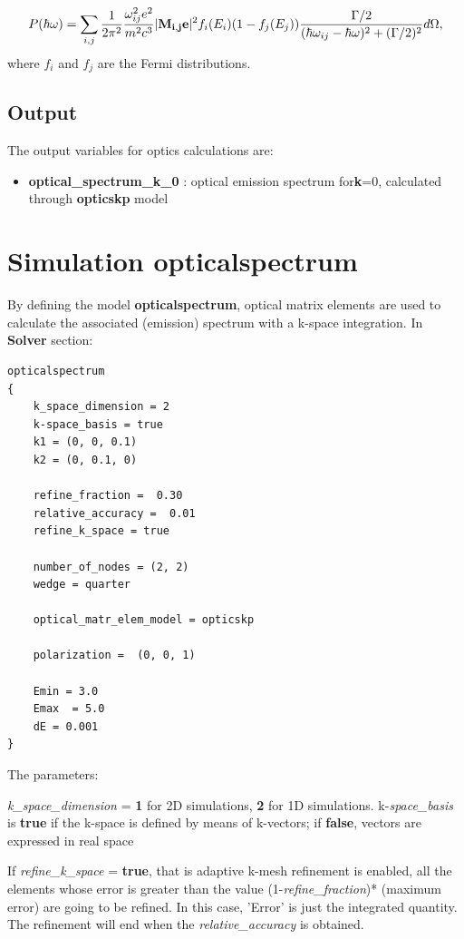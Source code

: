 \begin{equation}
P(\hbar \omega) = \sum_{i,j} \frac{1}{2\pi^2}  \frac{\omega^2_{ij} e^2 }{m^2 c^3}  
|{\bf M_{i,j} e}|^2 f_i(E_i)(1 - f_j(E_j)) 
\frac{\Gamma/2} {(\hbar \omega_{ij} - \hbar \omega)^2 + (\Gamma/2)^2} d\Omega,
\end{equation}
where $f_i$ and $f_j$ are the Fermi distributions.

\section{Output}

The output  variables for  optics  calculations are:
\begin{itemize}
\item \textbf{optical\_spectrum\_k\_0} : optical emission spectrum for\textbf{k}=0, calculated  through \textbf{opticskp} model
\end{itemize}

\chapter{Simulation opticalspectrum}
By defining the  model  \textbf{opticalspectrum},  optical matrix elements are used to calculate the  associated (emission) spectrum with a  k-space integration.
In \textbf{Solver} section:
\begin{verbatim}
opticalspectrum
{
    k_space_dimension = 2 
    k-space_basis = true
    k1 = (0, 0, 0.1)
    k2 = (0, 0.1, 0)

    refine_fraction =  0.30  
    relative_accuracy =  0.01  
    refine_k_space = true

    number_of_nodes = (2, 2) 
    wedge = quarter
 
    optical_matr_elem_model = opticskp

    polarization =  (0, 0, 1)

    Emin = 3.0
    Emax  = 5.0
    dE = 0.001
}
\end{verbatim}
The parameters:

\textit{k\_space\_dimension}  = \textbf{1} for 2D simulations,  
\textbf{2}  for  1D  simulations.
k-\textit{space\_basis} is \textbf{true} if  the k-space is  defined by means of k-vectors; if  \textbf{false}, vectors are expressed in real space  

If \textit{refine\_k\_space} = \textbf{true}, that is  adaptive  k-mesh  refinement is  enabled,  all the  elements whose error is  greater than the  value (1-\textit{refine\_fraction})* (maximum error)  are going  to  be  refined.
In this case, 'Error'  is  just the  integrated quantity.
The  refinement will end when the \textit{relative\_accuracy} is obtained.


